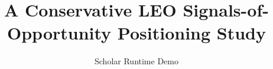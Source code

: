 \documentclass{article}
\title{A Conservative LEO Signals-of-Opportunity Positioning Study}
\author{Scholar Runtime Demo}
\begin{document}
\maketitle
\begin{abstract}

\end{abstract}







\end{document}
